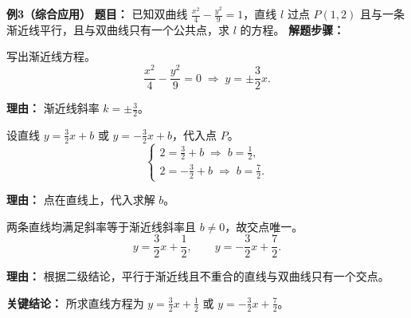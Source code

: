 \begin{examplebox}
	\medskip
	\textbf{\textcolor{CExample}{例3（综合应用）}}
	\textbf{\textcolor{CExample}{题目：}}
	已知双曲线 $\frac{x^2}{4} - \frac{y^2}{9} = 1$，直线 $l$ 过点 $P(1,2)$ 且与一条渐近线平行，且与双曲线只有一个公共点，求 $l$ 的方程。
	\textbf{\textcolor{CExample}{解题步骤：}}
	\begin{description}[style=nextline, leftmargin=2.8em, labelsep=0.5em, itemsep=0.45em]
		\item[\textbf{第一步（渐近线斜率）：}]
			写出渐近线方程。
			\[
				\frac{x^2}{4} - \frac{y^2}{9} = 0 \;\Rightarrow\; y = \pm\frac{3}{2}x.
			\]
			\par\textbf{理由：} 渐近线斜率 $k = \pm\frac{3}{2}$。
		\item[\textbf{第二步（设直线求截距）：}]
			设直线 $y = \frac{3}{2}x + b$ 或 $y = -\frac{3}{2}x + b$，代入点 $P$。
			\[
				\begin{cases}
					2 = \frac{3}{2} + b \;\Rightarrow\; b = \frac{1}{2},\\ 2 = -\frac{3}{2} + b \;\Rightarrow\; b = \frac{7}{2}.
			\end{cases}
			\]
			\par\textbf{理由：} 点在直线上，代入求解 $b$。
		\item[\textbf{第三步（应用结论）：}]
			两条直线均满足斜率等于渐近线斜率且 $b\neq0$，故交点唯一。
			\[
				y = \frac{3}{2}x + \frac{1}{2},
				\qquad
				y = -\frac{3}{2}x + \frac{7}{2}.
			\]
			\par\textbf{理由：} 根据二级结论，平行于渐近线且不重合的直线与双曲线只有一个交点。
	\end{description}
	\textbf{\textcolor{CExample}{关键结论：}}
	所求直线方程为 $y = \frac{3}{2}x + \frac{1}{2}$ 或 $y = -\frac{3}{2}x + \frac{7}{2}$。
\end{examplebox}

